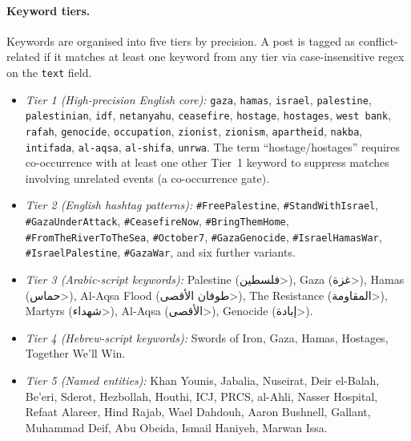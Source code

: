 \documentclass[12pt, a4paper]{article}
\begin{document}
\paragraph{Keyword tiers.} Keywords are organised into five tiers by precision. A post is tagged as conflict-related if it matches at least one keyword from any tier via case-insensitive regex on the \texttt{text} field.

\begin{itemize}
  \item \textit{Tier 1 (High-precision English core):} \texttt{gaza}, \texttt{hamas}, \texttt{israel}, \texttt{palestine}, \texttt{palestinian}, \texttt{idf}, \texttt{netanyahu}, \texttt{ceasefire}, \texttt{hostage}, \texttt{hostages}, \texttt{west bank}, \texttt{rafah}, \texttt{genocide}, \texttt{occupation}, \texttt{zionist}, \texttt{zionism}, \texttt{apartheid}, \texttt{nakba}, \texttt{intifada}, \texttt{al-aqsa}, \texttt{al-shifa}, \texttt{unrwa}. The term ``hostage/hostages'' requires co-occurrence with at least one other Tier~1 keyword to suppress matches involving unrelated events (a co-occurrence gate).

  \item \textit{Tier 2 (English hashtag patterns):} \texttt{\#FreePalestine}, \texttt{\#StandWithIsrael}, \texttt{\#GazaUnderAttack}, \texttt{\#CeasefireNow}, \texttt{\#BringThemHome}, \texttt{\#FromTheRiverToTheSea}, \texttt{\#October7}, \texttt{\#GazaGenocide}, \texttt{\#IsraelHamasWar}, \texttt{\#IsraelPalestine}, \texttt{\#GazaWar}, and six further variants.

  \item \textit{Tier 3 (Arabic-script keywords):} Palestine (\<فلسطين>), Gaza (\<غزة>), Hamas (\<حماس>), Al-Aqsa Flood (\<طوفان الأقصى>), The Resistance (\<المقاومة>), Martyrs (\<شهداء>), Al-Aqsa (\<الأقصى>), Genocide (\<إبادة>).

  \item \textit{Tier 4 (Hebrew-script keywords):} Swords of Iron, Gaza, Hamas, Hostages, Together We'll Win.

  \item \textit{Tier 5 (Named entities):} Khan Younis, Jabalia, Nuseirat, Deir el-Balah, Be'eri, Sderot, Hezbollah, Houthi, ICJ, PRCS, al-Ahli, Nasser Hospital, Refaat Alareer, Hind Rajab, Wael Dahdouh, Aaron Bushnell, Gallant, Muhammad Deif, Abu Obeida, Ismail Haniyeh, Marwan Issa.
\end{itemize}
\end{document}
